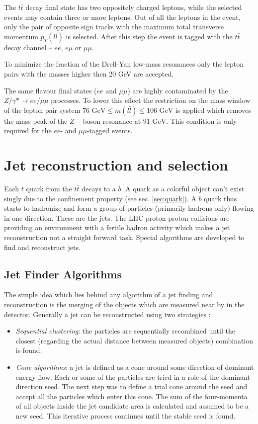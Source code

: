 The $t\bar{t}$ decay final state has two oppositely charged leptons, while the selected events may contain three or more leptons.
Out of all the leptons in the event, only the pair of opposite sign tracks with the maximum total transverse momentum $p_{T}(l\bar{l})$
is selected. After this step the event is tagged with the $t\bar{t}$ decay channel -- $ee$, $e\mu$ or $\mu\mu$.

To minimize the fraction of the Drell-Yan low-mass resonances only the lepton pairs with the masses higher then 20 GeV are accepted. 

The same flavour final states ($ee$ and $\mu\mu$) are highly contaminated by the $Z/\gamma * \to ee/\mu\mu$ processes. To lower this effect
the restriction on the mass window of the lepton pair system $\textrm{76 GeV} \leq m(l\bar{l}) \leq \textrm{106 GeV}$ is applied which removes  
the mass peak of the $Z-$boson resonance at $\textrm{91 GeV}$. This condition is only required for the $ee$- and $\mu\mu$-tagged events.


\section{Jet reconstruction and selection}

Each $t$ quark from the $t\bar{t}$ decays to a $b$. A quark as a colorful object can't exist singly due to the confinement property (see sec. \ref{sec:quark}).
A $b$ quark thus starts to hadronize and form a group of particles (primarily hadrons only) flowing in one direction. These are the jets. The LHC proton-proton collisions
are providing an environment with a fertile hadron activity which makes a jet reconstruction not a straight forward task. Special algorithms are developed
to find and reconstruct jets.

\subsection{Jet Finder Algorithms}

The simple idea which lies behind any algorithm of a jet finding and reconstruction is the merging of the objects which are measured near by in the detector.
Generally a jet can be reconstructed using two strategies \cite{Salam:2007xv}:

\begin{itemize}
 \item \textit{Sequential clustering}: the particles are sequentially recombined until the closest (regarding the actual distance between measured
 objects) combination is found.
 \item \textit{Cone algorithms}: a jet is defined as a cone around some direction of dominant energy flow. Each or some of the particles are tried 
 in a role of the dominant direction seed. The next step was to define a trial cone around the seed and accept all the particles which enter this cone.
 The sum of the four-momenta of all objects inside the jet candidate area is calculated and assumed to be a new seed. This iterative process continues
 until the stable seed is found.
\end{itemize}

